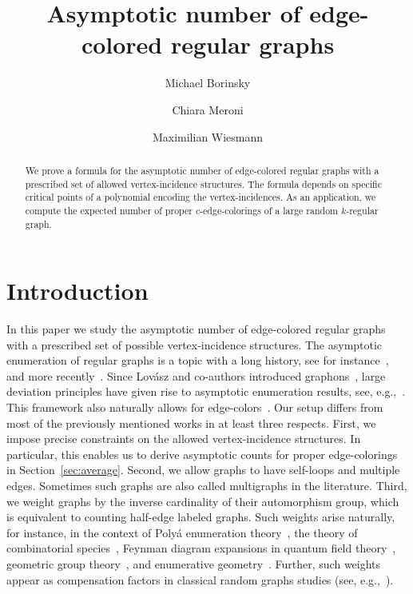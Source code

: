 \documentclass[a4paper,oneside]{amsart}
\title{Asymptotic number of edge-colored regular graphs}
\date{}
\author{Michael Borinsky \and Chiara Meroni \and Maximilian Wiesmann}
\numberwithin{theorem}{section}
\theoremstyle{remark}
\begin{document}
\begin{abstract}
  We prove a formula for the asymptotic number of edge-colored regular graphs with a prescribed set of allowed vertex-incidence structures. The formula depends on specific critical points of a polynomial encoding the vertex-incidences. As an application, we compute the expected number of proper $c$-edge-colorings of a large random $k$-regular graph.
\end{abstract}

\maketitle

\section{Introduction}

In this paper we study the asymptotic number of edge-colored regular graphs with a prescribed set of possible vertex-incidence structures. The asymptotic enumeration of regular graphs is a topic with a long history, see for instance~\cite{bender1978asymptotic,bollobas1982asymptotic,mckay1991asymptotic}, and more recently~\cite{liebenau2024asymptotic}.
Since Lov{\'a}sz and co-authors introduced graphons~\cite{lovasz2012large}, large deviation principles have given rise to asymptotic enumeration results, see, e.g.,~\cite[\S 6]{ChatterjeeLargeDeviations}. This framework also naturally allows for edge-colors~\cite[\S 23.2]{lovasz2012large}.
Our setup differs from most of the previously mentioned works in at least three respects. First, we impose precise constraints on the allowed vertex-incidence structures. In particular, this enables us to derive asymptotic counts for proper edge-colorings in Section~\ref{sec:average}. 
Second, we allow graphs to have self-loops and multiple edges. Sometimes such graphs are also called multigraphs in the literature.
Third, we weight graphs by the inverse cardinality of their automorphism group, which is equivalent to counting half-edge labeled graphs. Such weights arise naturally, for instance, in the context of Poly{\'a} enumeration theory~\cite{polya1937kombinatorische}, the theory of combinatorial species~\cite{MR633783}, 
Feynman diagram expansions in quantum field theory~\cite{MR603127}, geometric group theory~\cite{MR830040}, and enumerative geometry~\cite{MR1171758}. Further, such weights appear as compensation factors in classical random graphs studies (see, e.g.,~\cite{MR1220220}).
\end{document}
